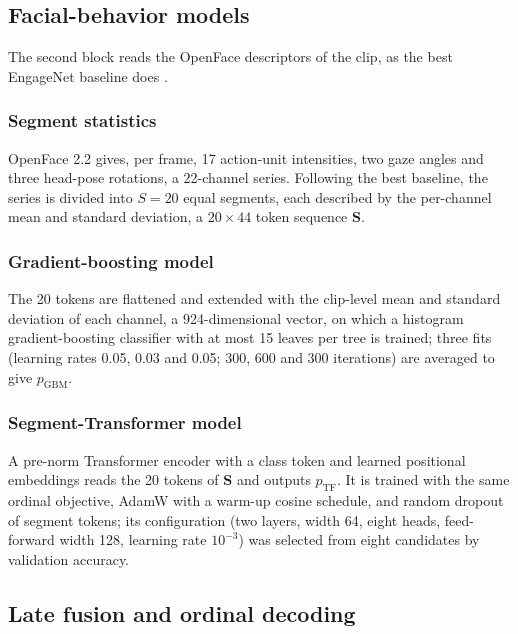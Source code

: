 \documentclass[pdflatex,iicol,sn-basic]{sn-jnl}
\begin{document}
\subsection{Facial-behavior models}\label{sec:method_beh}

The second block reads the OpenFace descriptors of the clip, as the best EngageNet baseline does \citep{singh2023engagenet}.

\subsubsection{Segment statistics}\label{sec:segstats}

OpenFace 2.2 \citep{baltrusaitis2018openface} gives, per frame, 17 action-unit intensities, two gaze angles and three head-pose rotations, a 22-channel series. Following the best baseline, the series is divided into $S = 20$ equal segments, each described by the per-channel mean and standard deviation, a $20 \times 44$ token sequence $\mathbf{S}$.

\subsubsection{Gradient-boosting model}\label{sec:gbm}

The 20 tokens are flattened and extended with the clip-level mean and standard deviation of each channel, a 924-dimensional vector, on which a histogram gradient-boosting classifier \citep{pedregosa2011sklearn} with at most 15 leaves per tree is trained; three fits (learning rates 0.05, 0.03 and 0.05; 300, 600 and 300 iterations) are averaged to give $p_{\mathrm{GBM}}$.

\subsubsection{Segment-Transformer model}\label{sec:segtf}

A pre-norm Transformer encoder \citep{vaswani2017attention} with a class token and learned positional embeddings reads the 20 tokens of $\mathbf{S}$ and outputs $p_{\mathrm{TF}}$. It is trained with the same ordinal objective, AdamW with a warm-up cosine schedule, and random dropout of segment tokens; its configuration (two layers, width 64, eight heads, feed-forward width 128, learning rate $10^{-3}$) was selected from eight candidates by validation accuracy.

\subsection{Late fusion and ordinal decoding}\label{sec:method_fusion}
\end{document}
